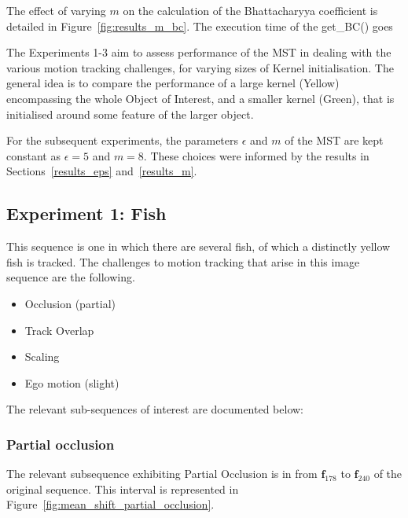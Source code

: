 The effect of varying $m$ on the calculation of the Bhattacharyya coefficient is
detailed in Figure~\ref{fig:results_m_bc}. The execution time of the get\_BC() goes  



The Experiments 1-3 aim to assess performance of the MST in dealing with the
various motion tracking challenges, for varying sizes of Kernel initialisation.
The general idea is to compare the performance of a large kernel (Yellow)
encompassing the whole Object of Interest, and a smaller kernel (Green), that is
initialised around some feature of the larger object. 

For the subsequent experiments, the parameters $\epsilon$ and $m$ of the MST are
kept constant as $\epsilon=5$ and $m=8$. These choices were informed by the results in
Sections~\ref{results_eps} and~\ref{results_m}. 

\subsection{Experiment 1: Fish}
This sequence is one in which there are several fish, of which a distinctly yellow fish is
tracked. The challenges to motion tracking that arise in this image sequence are the following.
\begin{itemize}
    \item Occlusion (partial)
    \item Track Overlap
    \item Scaling 
    \item Ego motion (slight) 
\end{itemize}

The relevant sub-sequences of interest are documented below:

\subsubsection{Partial occlusion}\label{mean_shift_partial_occlusion}
The relevant subsequence exhibiting Partial Occlusion is in from
$\mathbf{f}_{178}$ to $\mathbf{f}_{240}$ of the original sequence. This interval
is represented in Figure~\ref{fig:mean_shift_partial_occlusion}.

